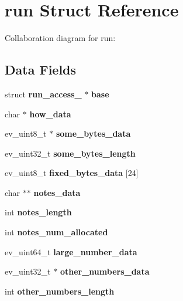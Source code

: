 \section{run \-Struct \-Reference}
\label{structrun}


\-Collaboration diagram for run\-:
\subsection*{\-Data \-Fields}
\begin{DoxyCompactItemize}
\item 
struct {\bf run\-\_\-access\-\_\-} $\ast$ {\bfseries base}\label{structrun_ae9086671b0668b84b64f52e7cd85650e}

\item 
char $\ast$ {\bfseries how\-\_\-data}\label{structrun_ac61ef85f57ef3834973a5a6d41d06628}

\item 
ev\-\_\-uint8\-\_\-t $\ast$ {\bfseries some\-\_\-bytes\-\_\-data}\label{structrun_aa075f152eb166dc211b7da287ce45a11}

\item 
ev\-\_\-uint32\-\_\-t {\bfseries some\-\_\-bytes\-\_\-length}\label{structrun_a199833937c49f1288f73fdc42be47283}

\item 
ev\-\_\-uint8\-\_\-t {\bfseries fixed\-\_\-bytes\-\_\-data} [24]\label{structrun_adbc20aff3c777675c3da25c4a81d3c58}

\item 
char $\ast$$\ast$ {\bfseries notes\-\_\-data}\label{structrun_a170c87122eba4f8becc769db295352d2}

\item 
int {\bfseries notes\-\_\-length}\label{structrun_afcded257a0b419c800e3b93964c37f6a}

\item 
int {\bfseries notes\-\_\-num\-\_\-allocated}\label{structrun_aa336ff897064e01d35c81803beb3f76c}

\item 
ev\-\_\-uint64\-\_\-t {\bfseries large\-\_\-number\-\_\-data}\label{structrun_a28d72e1398c960b3c84e245e0b1fda45}

\item 
ev\-\_\-uint32\-\_\-t $\ast$ {\bfseries other\-\_\-numbers\-\_\-data}\label{structrun_a75673ac18c5b8ce9ebfbb4f62d3e0fa7}

\item 
int {\bfseries other\-\_\-numbers\-\_\-length}\label{structrun_ac0387cfdaaba174a1c51f36df248e360}


\end{DoxyCompactItemize}
